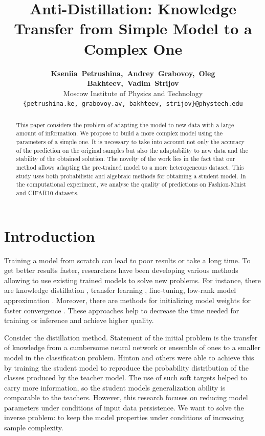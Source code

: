 \documentclass[80pt]{article}
\title{Anti-Distillation: Knowledge Transfer from Simple Model to a Complex One}
\author{\textbf{Kseniia~Petrushina,~Andrey~Grabovoy,~Oleg Bakhteev,~Vadim~Strijov} \\
	Moscow Institute of Physics and Technology \\
	\texttt{\{petrushina.ke,~grabovoy.av,~bakhteev,~strijov\}@phystech.edu}
}
\date{}
\begin{document}
\maketitle

\begin{abstract}
	This paper considers the problem of adapting the model to new data with a large amount of information. We propose to build a more complex model using the parameters of a simple one. It is necessary to take into account not only the accuracy of the prediction on the original samples but also the adaptability to new data and the stability of the obtained solution. The novelty of the work lies in the fact that our method allows adapting the pre-trained model to a more heterogeneous dataset. This study uses both probabilistic and algebraic methods for obtaining a student model. In the computational experiment, we analyse the quality of predictions on Fashion-Mnist and CIFAR10 datasets.
\end{abstract}


\section{Introduction}
Training a model from scratch can lead to poor results or take a long time. To get better results faster, researchers have been developing various methods allowing to use existing trained models to solve new problems. For instance, there are knowledge distillation \citep{hinton2015distilling, lopezpaz2016unifying}, transfer learning \citep{zhuang2019acomprehensive}, fine-tuning, low-rank model approximation \citep{yu2017oncompressing}. Moreover, there are methods for initializing model weights for faster convergence \citep{glorot2010understanding}. These approaches help to decrease the time needed for training or inference and achieve higher quality.

Consider the distillation method. Statement of the initial problem is the transfer of knowledge from a cumbersome neural network or ensemble of ones to a smaller model in the classification problem. Hinton and others \citep{hinton2015distilling} were able to achieve this by training the student model to reproduce the probability distribution of the classes produced by the teacher model. The use of such soft targets helped to carry more information, so the student models generalization ability is comparable to the teachers. However, this research focuses on reducing model parameters under conditions of input data persistence. We want to solve the inverse problem: to keep the model properties under conditions of increasing sample complexity.
\end{document}
